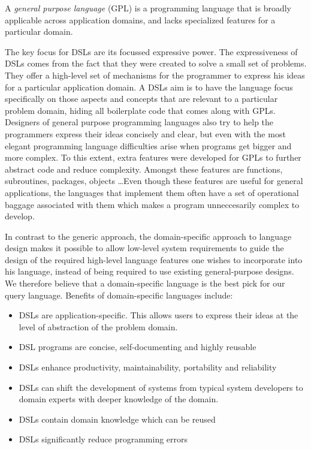 \begin{definition}
    A \textit{general purpose language} (GPL) is a programming language that is broadly applicable across application domains, and lacks specialized features for a particular domain.
\end{definition}

The key focus for DSLs are its focussed expressive power. The expressiveness of DSLs comes from the fact that they were created to solve a small set of problems. They offer a high-level set of mechanisms for the programmer to express his ideas for a particular application domain. A DSLs aim is to have the language focus specifically on those aspects and concepts that are relevant to a particular problem domain, hiding all boilerplate code that comes along with GPLs. Designers of general purpose programming languages also try to help the programmers express their ideas concisely and clear, but even with the most elegant programming language difficulties arise when programs get bigger and more complex. To this extent, extra features were developed for GPLs to further abstract code and reduce complexity. Amongst these features are functions, subroutines, packages, objects \dots  Even though these features are useful for general applications, the languages that implement them often have a set of operational baggage associated with them which makes a program unneccesarily complex to develop\cite{FluentInterfacesJava}. 

In contrast to the generic approach, the domain-specific approach to language design makes it possible to allow low-level system requirements to guide the design of the required high-level language features one wishes to incorporate into his language, instead of being required to use existing general-purpose designs.
We therefore believe that a domain-specific language is the best pick for our query language.
Benefits of domain-specific languages include:

\begin{itemize}
\item DSLs are application-specific. This allows users to express their ideas at the level of abstraction of the problem domain.
\item DSL programs are concise, self-documenting and highly reusable\cite{Bentley:1986}
\item DSLs enhance productivity, maintainability, portability and reliability
\item DSLs can shift the development of systems from typical system developers to domain experts with deeper knowledge of the domain.
\item DSLs contain domain knowledge which can be reused
\item DSLs significantly reduce programming errors
\end{itemize}

